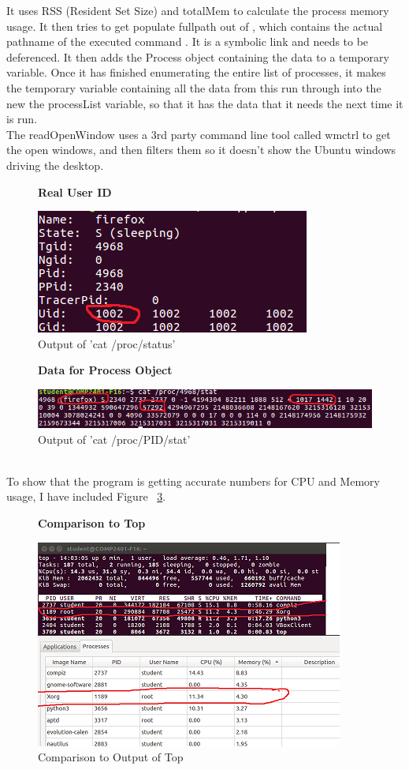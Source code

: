 \documentclass[12pt]{article}
\begin{document}
It uses RSS (Resident Set Size) and totalMem to calculate the process memory usage.
It then tries to get populate fullpath out of , which contains the actual pathname of the executed command \cite{manProc}. It is a symbolic link and needs to be deferenced. It then adds the Process object containing the data to a temporary variable. Once it has finished enumerating the entire list of processes, it makes the temporary variable containing all the data from this run through into the new the processList variable, so that it has the data that it needs the next time it is run.\\
The readOpenWindow uses a 3rd party command line tool called wmctrl\cite{wmtrl} to get the open windows, and then filters them so it doesn't show the Ubuntu windows driving the desktop.
\begin{figure}[h]
	\centering
	\textbf{Real User ID}\par\medskip
	\includegraphics{realUid}
	\caption{Output of 'cat /proc/status'}
	\label{figRealUid}
\end{figure}
\begin{figure}[h]
	\textbf{Data for Process Object}\par\medskip
	\includegraphics{procPidStat}
	\caption{Output of 'cat /proc/PID/stat'}
	\label{figProcPidStat}
\end{figure}
\\To show that the program is getting accurate numbers for CPU and Memory usage, I have included Figure ~\ref{figCompare}.
\begin{figure}[h]
	\centering
	\textbf{Comparison to Top}\par\medskip
	\includegraphics{compareToTop}
	\caption{Comparison to Output of Top}
	\label{figCompare}
\end{figure}
\end{document}
